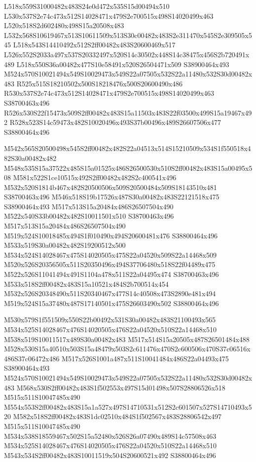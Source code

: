 \documentclass{article}
\begin{document}
\begin{multicols}{2}
L518x559S31000482x483S24e0d472x535S15d00494x510 L530x537S2e74c473x512S14028471x479S2e700515x498S14020499x463 L520x518S2d602480x498S15a20508x483 L532x568S10619467x513S10611509x513S30c00482x483S2e311470x545S2e309505x545 L518x543S14410492x512S2ff00482x483S20600469x517 L526x552S2033a497x537S20332497x520S14c30502x448S14c38475x456S2b720491x489 L518x550S36a00482x477S10e58491x520S26504471x509 S38900464x493 M524x570S10021494x549S10029473x549S22a07505x532S22a11480x532S30d00482x483 R525x515S18210502x500S18218476x500S20600490x486 R530x537S2e74c473x512S14028471x479S2e700515x498S14020499x463 S38700463x496 R526x530S22f15473x509S2ff00482x483S15a11503x483S22f03500x499S15a19467x492 R528x523S14c59473x482S10020496x493S37b00496x489S26607506x477 S38800464x496

M542x565S20500498x545S2ff00482x482S22a04513x514S15210509x534S1f550518x482S30a00482x482 M548x535S15a37522x485S15a01525x486S26500530x510S2ff00482x483S15a00495x508 M581x522S1ce10515x492S2ff00482x482S2c400541x496 M532x520S1814b467x482S20500506x509S20500484x509S18143510x481 S38700463x496 M546x518S19b17526x487S30a00482x483S22121518x475 S38900464x493 M517x513S15a20484x486S26507504x490 M522x540S33b00482x482S10011501x510 S38700463x496 M517x513S15a20484x486S26507504x490 M519x524S10018485x494S1f010490x494S20600481x476 S38800464x496 M533x519S30a00482x482S19200512x500 M534x524S14028467x475S14020505x475S22a04520x509S22a14468x509 M520x526S20356505x511S20350496x494S37706480x518S22f04489x475 M522x526S11041494x491S1104a478x511S22a04495x474 S38700463x496 M533x518S2ff00482x483S15a10521x484S2b700514x454 M532x526S20348490x511S20340467x477S14c40508x473S2890e481x494 M519x524S15a37480x487S17140501x475S26603490x502 S38800464x496

M530x579S1f551509x550S22b00492x531S30a00482x483S21100493x565 M534x525S14028467x476S14020505x476S22a04520x510S22a14468x510 M538x519S10011517x489S30a00482x483 M517x514S15a20505x487S26501484x488 M528x530S15a40510x503S15a48479x503S2c611476x470S2c600506x470S37c06516x486S37c06472x486 M517x526S1001a487x511S10041484x486S22a04493x475 S38900464x493 M524x570S10021494x549S10029473x549S22a07505x532S22a11480x532S30d00482x483 M568x530S2ff00482x483S1f502553x497S15d01498x507S28806526x518 M515x511S10047485x490 M554x553S2ff00482x483S15a1a527x497S14710531x512S2c601507x527S14710493x520 M582x518S2ff00482x483S1dc02510x484S1f502567x483S28806542x497 M515x511S10047485x490 M534x538S18559467x502S15a52480x526S26a07490x489S14c57508x463 M534x525S14028467x476S14020505x476S22a04520x510S22a14468x510 M543x534S2ff00482x483S10011519x504S20600521x492 S38800464x496


\end{multicols}
\end{document}
